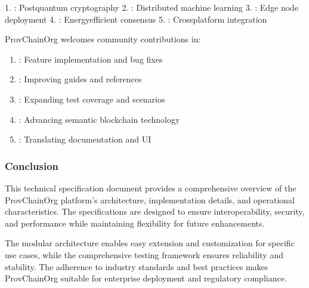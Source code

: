 \documentclass[letterpaper,10pt,english]{sphinxmanual}
\begin{document}
\sphinxAtStartPar
{}
1. : Post\sphinxhyphen{}quantum cryptography
2. : Distributed machine learning
3. : Edge node deployment
4. : Energy\sphinxhyphen{}efficient consensus
5. : Cross\sphinxhyphen{}platform integration

\sphinxAtStartPar
{}
ProvChainOrg welcomes community contributions in:
\begin{enumerate}
%
\item {} 
\sphinxAtStartPar
{}: Feature implementation and bug fixes

\item {} 
\sphinxAtStartPar
{}: Improving guides and references

\item {} 
\sphinxAtStartPar
{}: Expanding test coverage and scenarios

\item {} 
\sphinxAtStartPar
{}: Advancing semantic blockchain technology

\item {} 
\sphinxAtStartPar
{}: Translating documentation and UI

\end{enumerate}


\subsubsection{Conclusion}
\label{\detokenize{research/technical-specifications:conclusion}}
\sphinxAtStartPar
This technical specification document provides a comprehensive overview of the ProvChainOrg platform’s architecture, implementation details, and operational characteristics. The specifications are designed to ensure interoperability, security, and performance while maintaining flexibility for future enhancements.

\sphinxAtStartPar
The modular architecture enables easy extension and customization for specific use cases, while the comprehensive testing framework ensures reliability and stability. The adherence to industry standards and best practices makes ProvChainOrg suitable for enterprise deployment and regulatory compliance.
\end{document}
